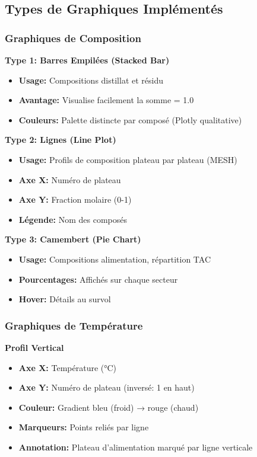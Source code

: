 \documentclass[11pt,a4paper]{article}
\begin{document}
\subsection{Types de Graphiques Implémentés}

\subsubsection{Graphiques de Composition}

\textbf{Type 1: Barres Empilées (Stacked Bar)}

\begin{itemize}[leftmargin=*]
    \item \textbf{Usage:} Compositions distillat et résidu
    \item \textbf{Avantage:} Visualise facilement la somme = 1.0
    \item \textbf{Couleurs:} Palette distincte par composé (Plotly qualitative)
\end{itemize}

\textbf{Type 2: Lignes (Line Plot)}

\begin{itemize}[leftmargin=*]
    \item \textbf{Usage:} Profils de composition plateau par plateau (MESH)
    \item \textbf{Axe X:} Numéro de plateau
    \item \textbf{Axe Y:} Fraction molaire (0-1)
    \item \textbf{Légende:} Nom des composés
\end{itemize}

\textbf{Type 3: Camembert (Pie Chart)}

\begin{itemize}[leftmargin=*]
    \item \textbf{Usage:} Compositions alimentation, répartition TAC
    \item \textbf{Pourcentages:} Affichés sur chaque secteur
    \item \textbf{Hover:} Détails au survol
\end{itemize}

\subsubsection{Graphiques de Température}

\textbf{Profil Vertical}

\begin{itemize}[leftmargin=*]
    \item \textbf{Axe X:} Température (°C)
    \item \textbf{Axe Y:} Numéro de plateau (inversé: 1 en haut)
    \item \textbf{Couleur:} Gradient bleu (froid) → rouge (chaud)
    \item \textbf{Marqueurs:} Points reliés par ligne
    \item \textbf{Annotation:} Plateau d'alimentation marqué par ligne verticale
\end{itemize}
\end{document}
